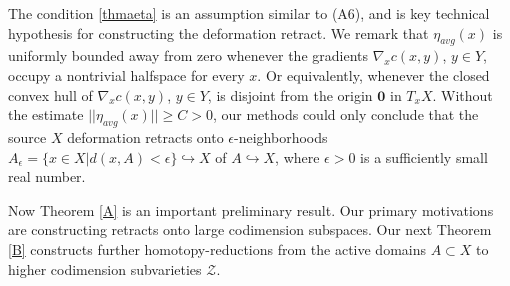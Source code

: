 \documentclass[12pt]{amsart}
\theoremstyle{definition}
\theoremstyle{remark}
\newcommand{\sE}{\mathscr{E}}
\newcommand{\sZ}{\mathscr{Z}}
\begin{document}
The condition \eqref{thmaeta} is an assumption similar to (A6), and is key technical hypothesis for constructing the deformation retract. We remark that $\eta_{avg}(x)$ is uniformly bounded away from zero whenever the gradients $\nabla_x c(x,y)$, $y\in Y$, occupy a nontrivial halfspace for every $x$. Or equivalently, whenever the closed convex hull of $\nabla_x c(x,y)$, $y\in Y$, is disjoint from the origin $\textbf{0}$ in $T_x X$. Without the estimate $||\eta_{avg}(x)||\geq C >0$, our methods could only conclude that the source $X$ deformation retracts onto $\epsilon$-neighborhoods $A_\epsilon=\{x\in X| d(x,A) <\epsilon\} \hookrightarrow X$ of $A\hookrightarrow X$, where $\epsilon>0$ is a sufficiently small real number. 

%





Now Theorem \ref{A} is an important preliminary result. Our primary motivations are constructing retracts onto large codimension subspaces. Our next Theorem \ref{B} constructs further homotopy-reductions from the active domains $A\subset X$ to higher codimension subvarieties $\sZ$.


\end{document}
